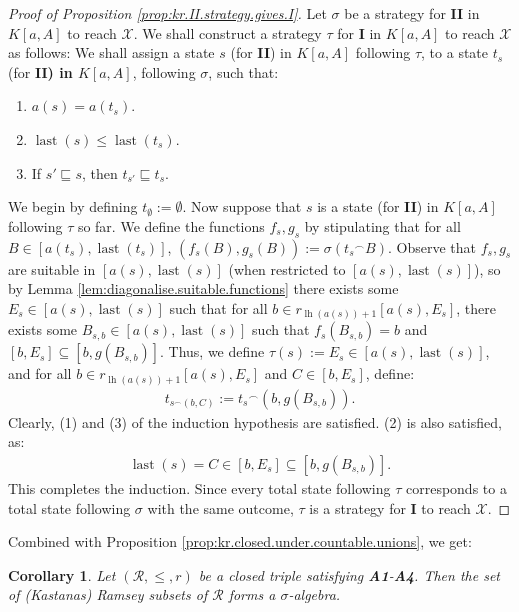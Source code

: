 \documentclass[11pt,reqno]{amsart}
\theoremstyle{plain}
\numberwithin{equation}{section}
\newtheorem{corollary}[theorem]{Corollary}
\theoremstyle{definition}
\newcommand{\func}{\operatorname}
\newcommand{\cal}{\mathcal}
\newcommand{\X}{\cal{X}}
\newcommand{\lh}{\func{lh}}
\newcommand{\last}{\func{last}}
\begin{document}
\begin{proof}[Proof of Proposition \ref{prop:kr.II.strategy.gives.I}]
    Let $\sigma$ be a strategy for \textbf{II} in $K[a,A]$ to reach $\X$. We shall construct a strategy $\tau$ for \textbf{I} in $K[a,A]$ to reach $\X$ as follows: We shall assign a state $s$ (for \textbf{II}) in $K[a,A]$ following $\tau$, to a state $t_s$ (for \textbf{II) in $K[a,A]$}, following $\sigma$, such that:
    \begin{enumerate}
        \item $a(s) = a(t_s)$.

        \item $\last(s) \leq \last(t_s)$. 

        \item If $s' \sqsubseteq s$, then $t_{s'} \sqsubseteq t_s$.
    \end{enumerate}
    We begin by defining $t_\emptyset := \emptyset$. Now suppose that $s$ is a state (for \textbf{II}) in $K[a,A]$ following $\tau$ so far. We define the functions $f_s,g_s$ by stipulating that for all $B \in [a(t_s),\last(t_s)]$, $(f_s(B),g_s(B)) := \sigma({t_s}^\frown B)$. Observe that $f_s,g_s$ are suitable in $[a(s),\last(s)]$ (when restricted to $[a(s),\last(s)]$), so by Lemma \ref{lem:diagonalise.suitable.functions} there exists some $E_s \in [a(s),\last(s)]$ such that for all $b \in r_{\lh(a(s))+1}[a(s),E_s]$, there exists some $B_{s,b} \in [a(s),\last(s)]$ such that $f_s(B_{s,b}) = b$ and $[b,E_s] \subseteq [b,g(B_{s,b})]$. Thus, we define $\tau(s) := E_s \in [a(s),\last(s)]$, and for all $b \in r_{\lh(a(s))+1}[a(s),E_s]$ and $C \in [b,E_s]$, define:
    \begin{align*}
        t_{s^\frown(b,C)} := {t_s}^\frown(b,g(B_{s,b})).
    \end{align*}
    Clearly, (1) and (3) of the induction hypothesis are satisfied. (2) is also satisfied, as:
    \begin{align*}
        \last(s) = C \in [b,E_s] \subseteq [b,g(B_{s,b})].
    \end{align*}
    This completes the induction. Since every total state following $\tau$ corresponds to a total state following $\sigma$ with the same outcome, $\tau$ is a strategy for \textbf{I} to reach $\X$.
\end{proof}


Combined with Proposition \ref{prop:kr.closed.under.countable.unions}, we get:

\begin{corollary}
\label{cor:measurable.is.ramsey}
    Let $(\cal{R},\leq,r)$ be a closed triple satisfying \textbf{A1}-\textbf{A4}. Then the set of (Kastanas) Ramsey subsets of $\cal{R}$ forms a $\sigma$-algebra.
\end{corollary}
\end{document}
